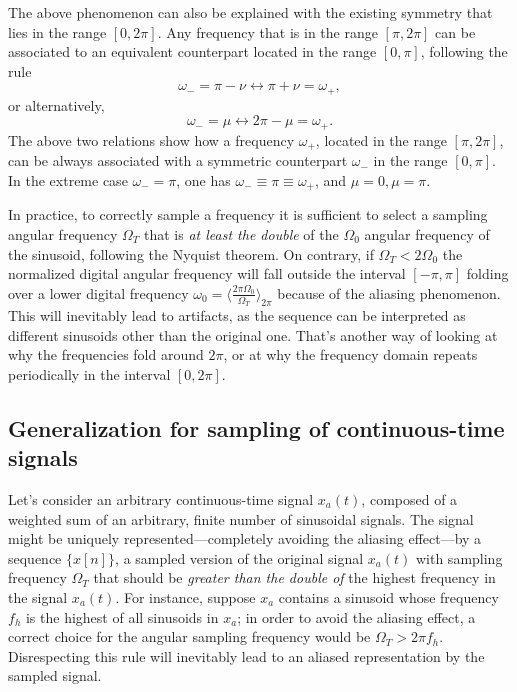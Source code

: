 \documentclass[\documentfontsize, twocolumn]{\classname}
\begin{document}
The above phenomenon can also be explained with the existing symmetry that lies in the range $[0, 2\pi]$. Any frequency that is in the range $[\pi, 2\pi]$ can be associated to an equivalent counterpart located in the range  $[0, \pi]$, following the rule \[\omega_- = \pi - \nu \leftrightarrow \pi + \nu = \omega_+,\] or alternatively, \[\omega_- = \mu \leftrightarrow 2\pi - \mu = \omega_+.\] The above two relations show how a frequency $\omega_+$, located in the range $[\pi, 2\pi]$, can be always associated with a symmetric counterpart $\omega_-$ in the range $[0, \pi]$. In the extreme case $\omega_- = \pi$, one has $\omega_- \equiv \pi \equiv \omega_+$, and $\mu = 0, \mu = \pi$.

In practice, to correctly sample a frequency it is sufficient to select a sampling angular frequency $\Omega_T$ that is \emph{at least the double} of the $\Omega_0$ angular frequency of the sinusoid, following the Nyquist theorem. On contrary, if $\Omega_T < 2\Omega_0$ the normalized digital angular frequency will fall outside the interval $[-\pi, \pi]$ folding over a lower digital frequency $\omega_0 = \langle \frac{2 \pi \Omega_0 }{\Omega_T}\rangle_{2\pi}$ because of the aliasing phenomenon. This will inevitably lead to artifacts, as the sequence can be interpreted as different sinusoids other than the original one.
That's another way of looking at why the frequencies fold around $2\pi$, or at why the frequency domain repeats periodically in the interval $[0, 2\pi]$.

\subsection{Generalization for sampling of continuous-time signals}

Let's consider an arbitrary continuous-time signal $x_a(t)$, composed of a weighted sum of an arbitrary, finite number of sinusoidal signals. The signal might be uniquely represented---completely avoiding the aliasing effect---by a sequence $\{x[n]\}$, a sampled version of the original signal $x_a(t)$ with sampling frequency $\Omega_T$ that should be \emph{greater than the double of} the highest frequency in the signal $x_a(t)$. For instance, suppose $x_a$ contains a sinusoid whose frequency $f_h$ is the highest of all sinusoids in $x_a$; in order to avoid the aliasing effect, a correct choice for the angular sampling frequency would be $\Omega_T > 2\pi f_h$. Disrespecting this rule will inevitably lead to an aliased representation by the sampled signal.
\end{document}
